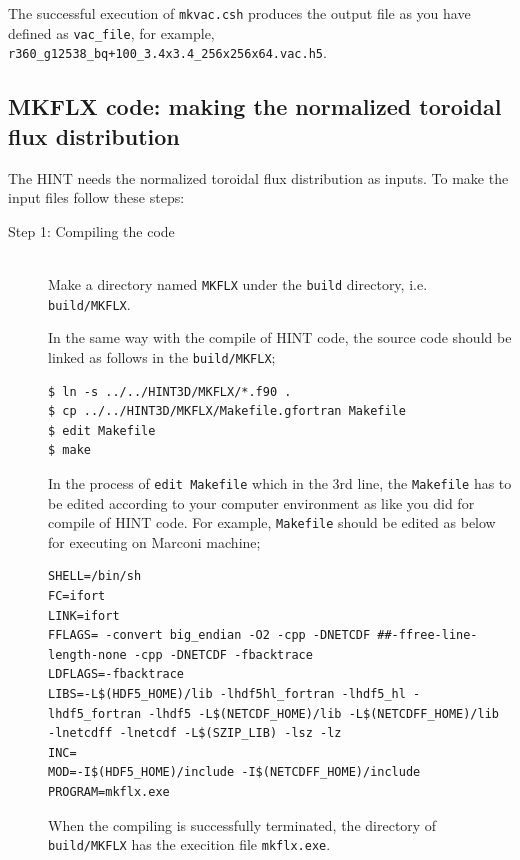 \documentclass[10pt]{ltxdoc} %
\begin{document}
The successful execution of \texttt{mkvac.csh} produces the output file as you have defined as \texttt{vac\_file}, for example, \texttt{r360\_g12538\_bq+100\_3.4x3.4\_256x256x64.vac.h5}. 

\subsection{MKFLX code: making the normalized toroidal flux distribution}
The HINT needs the normalized toroidal flux distribution as inputs. 
To make the input files follow these steps:
\begin{description}
 \item[Step 1: Compiling the code]\mbox{}\\
  Make a directory named \texttt{MKFLX} under the \texttt{build} directory, i.e. \texttt{build/MKFLX}. 

In the same way with the compile of HINT code, the source code should be linked as follows in the \texttt{build/MKFLX};
\vspace{2mm}
\begin{verbatim}
$ ln -s ../../HINT3D/MKFLX/*.f90 .
$ cp ../../HINT3D/MKFLX/Makefile.gfortran Makefile
$ edit Makefile
$ make
\end{verbatim}
\vspace{2mm}

In the process of \texttt{edit Makefile} which in the 3rd line, the \texttt{Makefile} has to be edited according to your computer environment as like you did for compile of HINT code. 
For example, \texttt{Makefile} should be edited as below for executing on Marconi machine;
\vspace{2mm}
\begin{verbatim}
SHELL=/bin/sh
FC=ifort
LINK=ifort
FFLAGS= -convert big_endian -O2 -cpp -DNETCDF ##-ffree-line-length-none -cpp -DNETCDF -fbacktrace
LDFLAGS=-fbacktrace
LIBS=-L$(HDF5_HOME)/lib -lhdf5hl_fortran -lhdf5_hl -lhdf5_fortran -lhdf5 -L$(NETCDF_HOME)/lib -L$(NETCDFF_HOME)/lib -lnetcdff -lnetcdf -L$(SZIP_LIB) -lsz -lz
INC=
MOD=-I$(HDF5_HOME)/include -I$(NETCDFF_HOME)/include
PROGRAM=mkflx.exe
\end{verbatim}
\vspace{2mm}

When the compiling is successfully terminated, the directory of \texttt{build/MKFLX} has the execition file \texttt{mkflx.exe}. 


\end{description}
\end{document}

